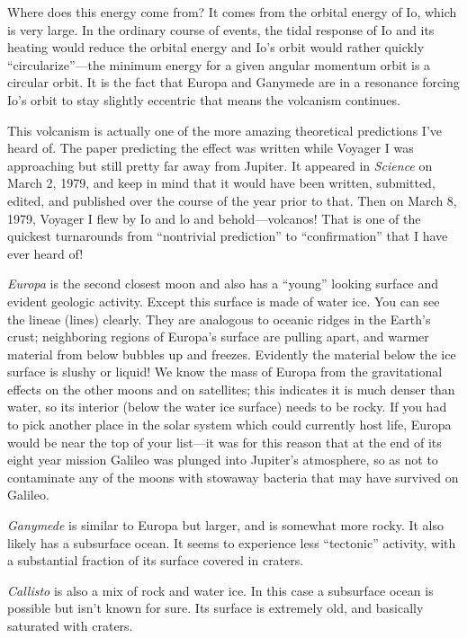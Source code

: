 \documentclass[12pt, preprint]{aastex}
\begin{document}
Where does this energy come from? It comes from the orbital energy of
Io, which is very large. In the ordinary course of events, the tidal
response of Io and its heating would reduce the orbital energy and
Io's orbit would rather quickly ``circularize''---the minimum energy
for a given angular momentum orbit is a circular orbit. It is the fact
that Europa and Ganymede are in a resonance forcing Io's orbit to stay
slightly eccentric that means the volcanism continues.

This volcanism is actually one of the more amazing theoretical
predictions I've heard of. The paper predicting the effect was written
while Voyager I was approaching but still pretty far away from
Jupiter. It appeared in {\it Science} on March 2, 1979, and keep in
mind that it would have been written, submitted, edited, and published
over the course of the year prior to that. Then on March 8, 1979,
Voyager I flew by Io and lo and behold---volcanos! That is one of the
quickest turnarounds from ``nontrivial prediction'' to
``confirmation'' that I have ever heard of!

{\it Europa} is the second closest moon and also has a ``young''
looking surface and evident geologic activity. Except this surface is
made of water ice. You can see the lineae (lines) clearly. They are
analogous to oceanic ridges in the Earth's crust; neighboring regions
of Europa's surface are pulling apart, and warmer material from below
bubbles up and freezes. Evidently the material below the ice surface
is slushy or liquid! We know the mass of Europa from the gravitational
effects on the other moons and on satellites; this indicates it is
much denser than water, so its interior (below the water ice surface)
needs to be rocky. If you had to pick another place in the solar
system which could currently host life, Europa would be near the top
of your list---it was for this reason that at the end of its eight
year mission Galileo was plunged into Jupiter's atmosphere, so as not
to contaminate any of the moons with stowaway bacteria that may have
survived on Galileo.

{\it Ganymede} is similar to Europa but larger, and is somewhat more
rocky. It also likely has a subsurface ocean. It seems to experience
less ``tectonic'' activity, with a substantial fraction of its surface
covered in craters.

{\it Callisto} is also a mix of rock and water ice. In this case a
subsurface ocean is possible but isn't known for sure. Its surface is
extremely old, and basically saturated with craters.
\end{document}
